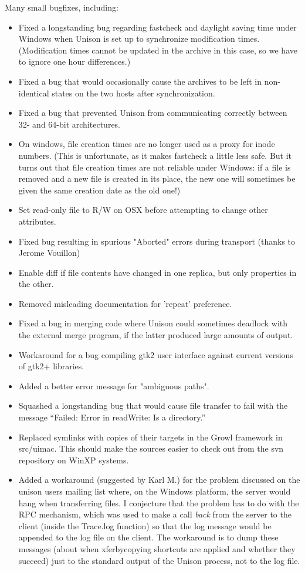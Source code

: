 \begin{changesfromversion}{2.17}
\item Many small bugfixes, including:
\begin{itemize}
\item Fixed a longstanding bug regarding fastcheck and daylight saving time
  under Windows when Unison is set up to synchronize modification times.
  (Modification times cannot be updated in the archive in this case,
  so we have to ignore one hour differences.)
\item Fixed a bug that would occasionally cause the archives to be left in
  non-identical states on the two hosts after synchronization.
\item Fixed a bug that prevented Unison from communicating correctly between
  32- and 64-bit architectures.
\item On windows, file creation times are no longer used as a proxy for
  inode numbers.  (This is unfortunate, as it makes fastcheck a little less
  safe.  But it turns out that file creation times are not reliable
  under Windows: if a file is removed and a new file is created in its
  place, the new one will sometimes be given the same creation date as the
  old one!)
\item Set read-only file to R/W on OSX before attempting to change other attributes.
\item Fixed bug resulting in spurious "Aborted" errors during transport
(thanks to Jerome Vouillon)
\item Enable diff if file contents have changed in one replica, but
only properties in the other.
\item Removed misleading documentation for 'repeat' preference.
\item Fixed a bug in merging code where Unison could sometimes deadlock
  with the external merge program, if the latter produced large
  amounts of output.
\item Workaround for a bug compiling gtk2 user interface against current versions
  of gtk2+ libraries.
\item Added a better error message for "ambiguous paths".
\item Squashed a longstanding bug that would cause file transfer to fail
  with the message ``Failed: Error in readWrite: Is a directory.''
\item Replaced symlinks with copies of their targets in the Growl framework in src/uimac.
  This should make the sources easier to check out from the svn repository on WinXP
  systems.
\item Added a workaround (suggested by Karl M.) for the problem discussed
  on the unison users mailing list where, on the Windows platform, the
  server would hang when transferring files.  I conjecture that
  the problem has to do with the RPC mechanism, which was used to
  make a call {\em back} from the server to the client (inside the Trace.log
  function) so that the log message would be appended to the log file on
  the client.  The workaround is to dump these messages (about when
  xferbycopying shortcuts are applied and whether they succeed) just to the
  standard output of the Unison process, not to the log file.
\end{itemize}
\end{changesfromversion}

